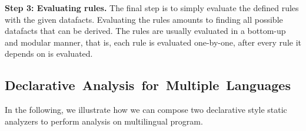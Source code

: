 




\medskip
\textbf{Step 3: Evaluating rules.}
The final step is to simply evaluate the defined rules with the given datafacts.
Evaluating the rules amounts to finding all possible
datafacts that can be derived. The rules are usually evaluated in a bottom-up
and modular manner, that is, each rule is evaluated one-by-one, after every
rule it depends on is evaluated.

\subsection{\mbox{Declarative Analysis for Multiple Languages}}

In the following, we illustrate how we can compose two declarative style static analyzers
to perform analysis on multilingual program.

